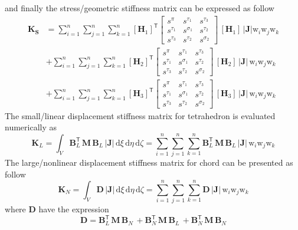 and finally the stress/geometric stiffness matrix can be expressed as follow
\begin{equation}
\begin{aligned}
\mathbf{K_{\mathbf{S}}} & = \sum_{i=1}^{n}  \sum_{j=1}^{n}  \sum_{k=1}^{n} [\mathbf{H}_1]^{\mathsf{T}}  \begin{bmatrix} s^{\pi} & s^{\tau_1} & s^{\tau_3}\\ 
s^{\tau_1} & s^{\sigma_1} & s^{\tau_2} \\ 
s^{\tau_3} & s^{\tau_2} & s^{\sigma_2}
\end{bmatrix} \, [\mathbf{H}_1] \, |\mathbf{J}|  \mathrm{w}_i \mathrm{w}_j \mathrm{w}_k \\
& + \sum_{i=1}^{n}  \sum_{j=1}^{n}  \sum_{k=1}^{n} [\mathbf{H}_2]^{\mathsf{T}}  \begin{bmatrix} s^{\pi} & s^{\tau_1} & s^{\tau_3}\\ 
s^{\tau_1} & s^{\sigma_1} & s^{\tau_2} \\ 
s^{\tau_3} & s^{\tau_2} & s^{\sigma_2}
\end{bmatrix} \, [\mathbf{H}_2] \, |\mathbf{J}|  \, \mathrm{w}_i \mathrm{w}_j \mathrm{w}_k \\
& + \sum_{i=1}^{n}  \sum_{j=1}^{n}  \sum_{k=1}^{n} [\mathbf{H}_3]^{\mathsf{T}}  \begin{bmatrix} s^{\pi} & s^{\tau_1} & s^{\tau_3}\\ 
s^{\tau_1} & s^{\sigma_1} & s^{\tau_2} \\ 
s^{\tau_3} & s^{\tau_2} & s^{\sigma_2}
\end{bmatrix} \, [\mathbf{H}_3] \, |\mathbf{J}|  \, \mathrm{w}_i \mathrm{w}_j \mathrm{w}_k
\end{aligned}
\end{equation}
The small/linear displacement stiffness matrix for tetrahedron is evaluated numerically as 
\begin{equation}
\mathbf{K}_{L} = \int_{V} \mathbf{B}_L^{\mathsf{T}} \, \mathbf{M} \, \mathbf{B}_L \, |\mathbf{J}| \,  \mathrm{d} \xi \,  \mathrm{d} \eta \,  \mathrm{d} \zeta =  \sum_{i=1}^{n}  \sum_{j=1}^{n}  \sum_{k=1}^{n}  \mathbf{B}_L^{\mathsf{T}} \, \mathbf{M} \, \mathbf{B}_L \, |\mathbf{J}|  \, \mathrm{w}_i \mathrm{w}_j \mathrm{w}_k
\end{equation}
The large/nonlinear displacement stiffness matrix for chord can be presented as follow
\begin{equation}
\mathbf{K}_{N} = \int_{V} \mathbf{D} \, |\mathbf{J}|\, \mathrm{d} \xi \, \mathrm{d} \eta \, \mathrm{d} \zeta
= \sum_{i=1}^{n}  \sum_{j=1}^{n}  \sum_{k=1}^{n}  \mathbf{D} \, |\mathbf{J}| \, \mathrm{w}_i \mathrm{w}_j \mathrm{w}_k
\end{equation}
where $\mathbf{D}$ have the expression 
\begin{equation}
\mathbf{D} = \mathbf{B}_L^{\mathsf{T}} \, \mathbf{M} \, \mathbf{B}_N \, + \mathbf{B}_N^{\mathsf{T}} \, \mathbf{M} \, \mathbf{B}_L \, + \mathbf{B}_N^{\mathsf{T}} \, \mathbf{M} \, \mathbf{B}_N
\end{equation}


